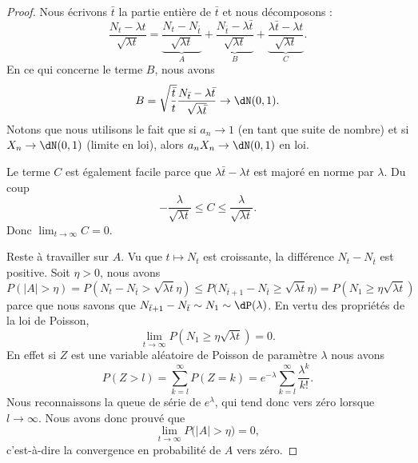 \begin{proof}
	Nous écrivons \( \bar t\) la partie entière de \( \bar t\) et nous décomposons :
	\begin{equation}
		\frac{ N_t-\lambda t }{ \sqrt{\lambda t} }=\underbrace{\frac{ N_t-N_{\bar t} }{ \sqrt{\lambda t} }}_A+\underbrace{\frac{ N_{\bar t}-\lambda \bar t }{ \sqrt{\lambda t} }}_B+\underbrace{\frac{ \lambda \bar t-\lambda t }{ \sqrt{\lambda t} }}_C.
	\end{equation}
	En ce qui concerne le terme \( B\), nous avons
	\begin{equation}
		B=\sqrt{\frac{ \bar t }{ t }}\frac{ N_{\bar t}-\lambda \bar t }{ \sqrt{\lambda \bar t} }\to\dN(0,1).
	\end{equation}
	Notons que nous utilisons le fait que si \( a_n\to 1\) (en tant que suite de nombre) et si \( X_n\to\dN(0,1)\) (limite en loi), alors \( a_nX_n\to \dN(0,1)\) en loi.

	Le terme \( C\) est également facile parce que \( \lambda \bar t-\lambda t\) est majoré en norme par \( \lambda\). Du coup
	\begin{equation}
		-\frac{ \lambda }{ \sqrt{\lambda t} }\leq C\leq \frac{ \lambda }{ \sqrt{\lambda t} }.
	\end{equation}
	Donc \( \lim_{t\to \infty} C=0\).

	Reste à travailler sur \( A\). Vu que \( t\mapsto N_t\) est croissante, la différence \( N_t-N_{\bar t}\) est positive. Soit \( \eta>0\), nous avons
	\begin{equation}
		P(| A |>\eta)=P(N_t-N_{\bar t}>\sqrt{\lambda t}\eta)\leq P\big( N_{\bar t+1}-N_{\bar t}\geq \sqrt{\lambda t}\eta \big)=P(N_1\geq \eta\sqrt{\lambda t})
	\end{equation}
	parce que nous savons que \( N_{\bar t+1}-N_{\bar t}\sim N_1\sim\dP(\lambda)\). En vertu des propriétés de la loi de Poisson,
	\begin{equation}
		\lim_{t\to \infty}P(N_1\geq \eta\sqrt{\lambda t})=0.
	\end{equation}
	En effet si \( Z\) est une variable aléatoire de Poisson de paramètre \( \lambda\) nous avons
	\begin{equation}
		P(Z>l)=\sum_{k=l}^{\infty}P(Z=k)= e^{-\lambda}\sum_{k=l}^{\infty}\frac{ \lambda^k }{ k! }.
	\end{equation}
	Nous reconnaissons la queue de série de \(  e^{\lambda}\), qui tend donc vers zéro lorsque \( l\to \infty\). Nous avons donc prouvé que
	\begin{equation}
		\lim_{t\to \infty} P\big( | A |>\eta \big)=0,
	\end{equation}
	c'est-à-dire la convergence en probabilité de \( A\) vers zéro.


\end{proof}
